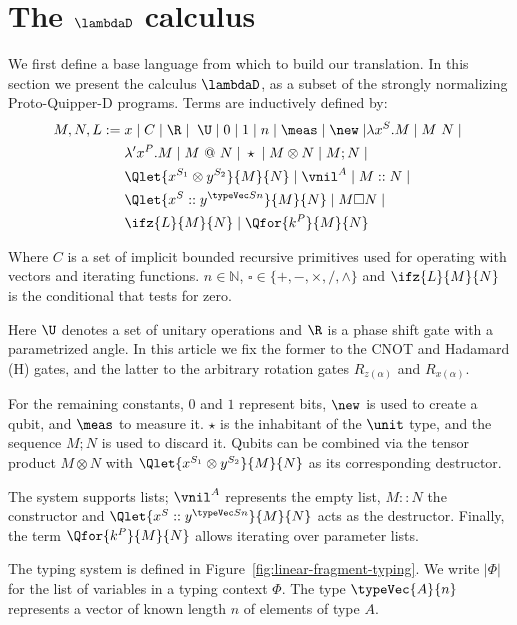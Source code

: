 \section{The \texorpdfstring{$\lambdaD$}{lambda sub D} calculus}%
\label{sec:fragment}

We first define a base language from which to build our translation. In this section we present the calculus $\lambdaD$, as a subset of the strongly normalizing Proto-Quipper-D programs. Terms are inductively defined by:
\begin{align*}
    M, N, L :=\; & x \;|\; C \;|\; \R \;|\; \; \U \;|\; 0 \;|\; 1 \;|\; n \;|\; \meas \;|\; \new \;|
            \lambda x^S. M \;|\; M \ N \;|\;\\
        & \lambda' x^P. M \;|\; M\ @\ N \;|\;\star \;|\; M \otimes N \;|\; M;N \;|\; \\
        & \Qlet{x^{S_1} \otimes y^{S_2}}{M}{N} \;|\;\vnil^A \;|\; M :: N \;|\; \\
        & \Qlet{x^S :: y^{\typeVec S n}}{M}{N} \;|\;M \square N \;|\;\\
        & \ifz{L}{M}{N} \;|\; \Qfor{k^P}{M}{N}
\end{align*}

Where $C$ is a set of implicit bounded recursive primitives used for operating
with vectors and iterating functions. $n\in\mathbb{N}$, $\square\in\{+, -,
\times, / , \wedge\}$ and $\ifz{L}{M}{N}$ is the conditional that tests for
zero.

Here $\U$ denotes a set of unitary operations and $\R$ is a phase shift gate
with a parametrized angle. In this article we fix the former to the CNOT and
Hadamard (H) gates, and the latter to the arbitrary rotation gates
$R_{z(\alpha)}$ and $R_{x(\alpha)}$.

For the remaining constants, $0$ and $1$ represent bits, $\new$ is used to
create a qubit, and $\meas$ to measure it. $\star$ is the inhabitant of the
$\unit$ type, and the sequence $M;N$ is used to discard it. Qubits can be
combined via the tensor product $M\otimes N$ with $\Qlet{x^{S_1} \otimes
y^{S_2}}{M}{N}$ as its corresponding destructor.
 
The system supports lists; $\vnil^A$ represents the empty list, $M::N$ the
constructor and $\Qlet{x^S :: y^{\typeVec S n}}{M}{N}$ acts as the destructor. 
Finally, the term $\Qfor{k^P}{M}{N}$ allows iterating over parameter lists.

The typing system is defined in Figure~\ref {fig:linear-fragment-typing}. We
write $|\Phi|$ for the list of variables in a typing context $\Phi$. The type
$\typeVec{A}{n}$ represents a vector of known length $n$ of elements of type $A$.

